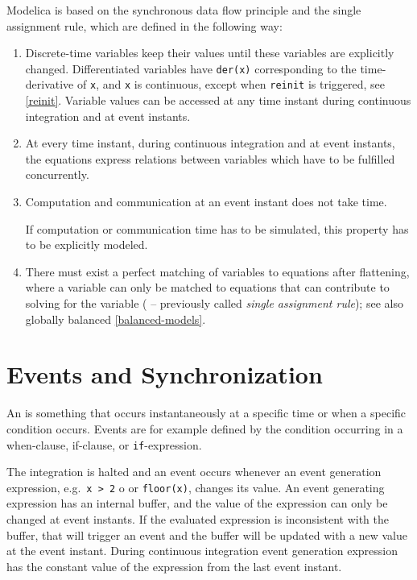 Modelica is based on the synchronous data flow principle and the single
assignment rule, which are defined in the following way:
\begin{enumerate}
\item Discrete-time variables keep their values until these variables are explicitly changed.
Differentiated variables have \lstinline!der(x)! corresponding to the time-derivative of \lstinline!x!,
and \lstinline!x! is continuous, except when \lstinline!reinit! is triggered, see \cref{reinit}.
Variable values can be accessed at any time instant during continuous integration and at event instants.

\item At every time instant, during continuous integration and at event instants,
the equations express relations between variables which have to be fulfilled concurrently.

\item Computation and communication at an event instant does not take time.
\begin{nonnormative}
If computation or communication time has to be simulated, this property has to be explicitly modeled.
\end{nonnormative}

\item There must exist a perfect matching of variables to equations after flattening, where a variable can only
be matched to equations that can contribute to solving for the variable
( -- previously called \emph{single assignment rule}); see also globally balanced \cref{balanced-models}.
\end{enumerate}

\section{Events and Synchronization}\label{events-and-synchronization}

An  is something that occurs instantaneously at a specific time or when a specific condition occurs.
Events are for example defined by the condition occurring in a when-clause, if-clause, or \lstinline!if!-expression.

The integration is halted and an event occurs whenever an event
generation expression, e.g.\ \lstinline!x > 2! o or \lstinline!floor(x)!, changes
its value. An event generating expression has an internal buffer, and
the value of the expression can only be changed at event instants. If
the evaluated expression is inconsistent with the buffer, that will
trigger an event and the buffer will be updated with a new value at the
event instant. During continuous integration event generation expression
has the constant value of the expression from the last event instant.

